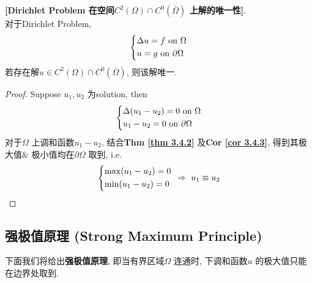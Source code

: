 	\vspace{2em}
	
	\begin{proposition}\label{prop 3.4.2}
		\textbf{[Dirichlet Problem 在空间$C^2(\Omega) \cap C^0\left( \overline{\Omega} \right)$ 上解的唯一性]}. \\
		对于Dirichlet Problem, 
		\begin{align*}
			\begin{dcases*}
				\Delta u = f \,\, \text{on} \,\, \Omega \\
				u = g \,\, \text{on} \,\, \partial \Omega
			\end{dcases*}
		\end{align*}
		若存在解$u \in C^2(\Omega) \cap C^0 \left( \overline{\Omega} \right)$, 则该解唯一. 
		
		\vspace{6em}
		
		\begin{proof}
			Suppose $u_1 , u_2$ 为solution, then
			\begin{align*}
				\begin{dcases*}
					\Delta(u_1 - u_2) = 0 \,\, \text{on} \,\, \Omega \\
					u_1 - u_2 = 0 \,\, \text{on} \,\, \partial \Omega
				\end{dcases*}
			\end{align*}
			对于$\Omega$ 上调和函数$u_1 - u_2$, 结合\textbf{Thm \ref{thm 3.4.2}} 及\textbf{Cor \ref{cor 3.4.3}}, 得到其极大值$\&$ 极小值均在$\partial \Omega$ 取到, i.e. 
			\begin{align*}
				\begin{dcases*}
					\max (u_1 - u_2) = 0 \\
					\min (u_1 - u_2) = 0
				\end{dcases*} \,\, \Rightarrow \,\, u_1 \equiv u_2
			\end{align*}
		\end{proof}
	\end{proposition}

\newpage

\subsection{强极值原理 (Strong Maximum Principle)}

	下面我们将给出\textbf{强极值原理}, 即当有界区域$\Omega$ 连通时, 下调和函数$u$ 的极大值只能在边界处取到. 
	
	\vspace{1em}
	
